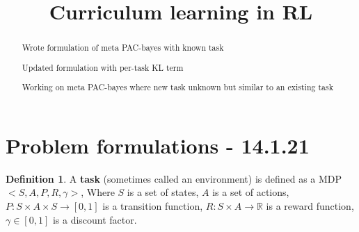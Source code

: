 \documentclass[letterpaper]{article}
\title{Curriculum learning in RL}
\theoremstyle{definition}
\newtheorem{defn}{Definition}[section]
\begin{document}
	
	\maketitle
	\begin{abstract}
		Wrote formulation of meta PAC-bayes with known task
		
		Updated formulation with per-task KL term
		
		Working on meta PAC-bayes where new task unknown but similar to an existing task
	\end{abstract}

\tableofcontents

\section{Problem formulations - 14.1.21} \label{sec:formulation}
\begin{defn}
	A \textbf{task} (sometimes called an environment) is defined as a MDP $<S,A,P,R,\gamma>$,
	Where $S$ is a set of states, $A$ is a set of actions, $P:S\times A\times S\rightarrow [0,1]$ is a transition function, 
	$R:S\times A\rightarrow \mathbb{R}$ is a reward function, $\gamma\in[0,1]$ is a discount factor.
\end{defn}
\end{document}
